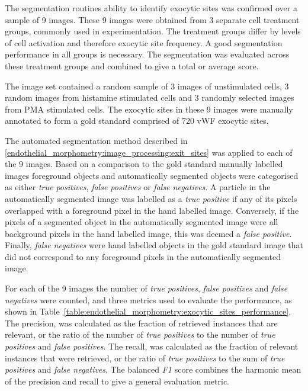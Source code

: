 The segmentation routines ability to identify exocytic sites was confirmed over a sample of 9 images. These 9 images were obtained from 3 separate cell treatment groups, commonly used in experimentation. The treatment groups differ by levels of cell activation and therefore exocytic site frequency. A good segmentation performance in all groups is necessary. The segmentation was evaluated across these treatment groups and combined to give a total or average score.

The image set contained a random sample of 3 images of unstimulated cells, 3 random images from histamine stimulated cells and 3 randomly selected images from PMA stimulated cells. The exocytic sites in these 9 images were manually annotated to form a gold standard comprised of 720 vWF exocytic sites.

The automated segmentation method described in \autoref{endothelial_morphometry:image_processing:exit_sites} was applied to each of the 9 images. Based on a comparison to the gold standard manually labelled images foreground objects and automatically segmented objects were categorised as either \emph{true positives}, \emph{false positives} or \emph{false negatives}. A particle in the automatically segmented image was labelled as a \emph{true positive} if any of its pixels overlapped with a foreground pixel in the hand labelled image. Conversely, if the pixels of a segmented object in the automatically segmented image were all background pixels in the hand labelled image, this was deemed a \emph{false positive}. Finally, \emph{false negatives} were hand labelled objects in the gold standard image that did not correspond to any foreground pixels in the automatically segmented image.

For each of the 9 images the number of \emph{true positives}, \emph{false positives} and \emph{false negatives} were counted, and three metrics used to evaluate the performance, as shown in Table~\ref{table:endothelial_morphometry:exocytic_sites_performance}. The precision, was calculated as the fraction of retrieved instances that are relevant, or the ratio of the number of \emph{true positives} to the number of \emph{true positives} and \emph{false positives}. The recall, was calculated as the fraction of relevant instances that were retrieved, or the ratio of \emph{true positives} to the sum of \emph{true positives} and \emph{false negatives}. The balanced \emph{F1} score combines the harmonic mean of the precision and recall to give a general evaluation metric.

